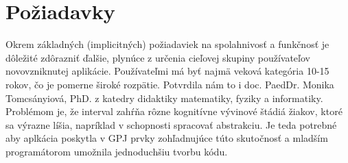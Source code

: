 \section{Požiadavky}
Okrem základných (implicitných) požiadaviek na spolahnivosť a funkčnosť je dôležité zdôrazniť ďalšie, plynúce z určenia cieľovej skupiny používateľov novovzniknutej aplikácie. Používateľmi má byť najmä veková kategória 10-15 rokov, čo je pomerne široké rozpätie. Potvrdila nám to i doc. PaedDr. Monika Tomcsányiová, PhD. z katedry didaktiky matematiky, fyziky a informatiky. Problémom je, že interval zahŕňa rôzne kognitívne vývinové štádiá žiakov, ktoré sa výrazne líšia, napríklad v schopnosti spracovať abstrakciu. Je teda potrebné aby aplkácia poskytla v GPJ prvky zohľadnujúce túto skutočnosť a mladším programátorom umožnila jednoduchšiu tvorbu kódu.